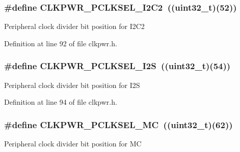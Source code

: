 \subsubsection[{\texorpdfstring{C\+L\+K\+P\+W\+R\+\_\+\+P\+C\+L\+K\+S\+E\+L\+\_\+\+I2\+C2}{CLKPWR_PCLKSEL_I2C2}}]{\setlength{\rightskip}{0pt plus 5cm}\#define C\+L\+K\+P\+W\+R\+\_\+\+P\+C\+L\+K\+S\+E\+L\+\_\+\+I2\+C2~(({\bf uint32\+\_\+t})(52))}\hypertarget{group___c_l_k_p_w_r___public___macros_gafbf149f2011d8691c7e1b9c3fe1383f4}{}\label{group___c_l_k_p_w_r___public___macros_gafbf149f2011d8691c7e1b9c3fe1383f4}
Peripheral clock divider bit position for I2\+C2 

Definition at line 92 of file clkpwr.\+h.

\subsubsection[{\texorpdfstring{C\+L\+K\+P\+W\+R\+\_\+\+P\+C\+L\+K\+S\+E\+L\+\_\+\+I2S}{CLKPWR_PCLKSEL_I2S}}]{\setlength{\rightskip}{0pt plus 5cm}\#define C\+L\+K\+P\+W\+R\+\_\+\+P\+C\+L\+K\+S\+E\+L\+\_\+\+I2S~(({\bf uint32\+\_\+t})(54))}\hypertarget{group___c_l_k_p_w_r___public___macros_gabaeef97fdbabc0fee54c07786ee6e1ba}{}\label{group___c_l_k_p_w_r___public___macros_gabaeef97fdbabc0fee54c07786ee6e1ba}
Peripheral clock divider bit position for I2S 

Definition at line 94 of file clkpwr.\+h.

\subsubsection[{\texorpdfstring{C\+L\+K\+P\+W\+R\+\_\+\+P\+C\+L\+K\+S\+E\+L\+\_\+\+MC}{CLKPWR_PCLKSEL_MC}}]{\setlength{\rightskip}{0pt plus 5cm}\#define C\+L\+K\+P\+W\+R\+\_\+\+P\+C\+L\+K\+S\+E\+L\+\_\+\+MC~(({\bf uint32\+\_\+t})(62))}\hypertarget{group___c_l_k_p_w_r___public___macros_ga6f1c261af43582c0e9b2bc3ac5e603d1}{}\label{group___c_l_k_p_w_r___public___macros_ga6f1c261af43582c0e9b2bc3ac5e603d1}
Peripheral clock divider bit position for MC 

